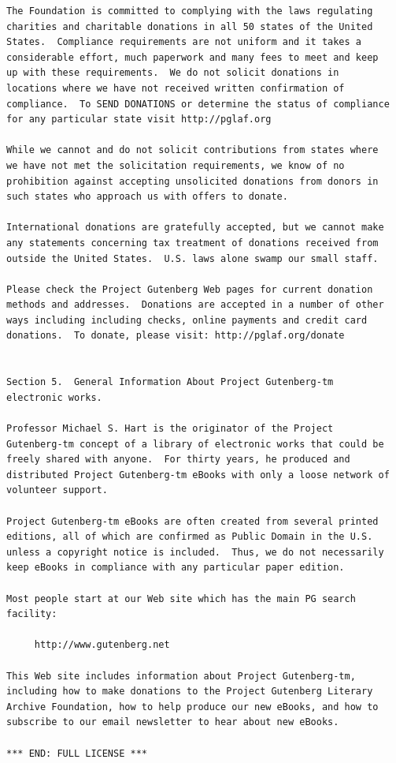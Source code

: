 \documentclass{book}[2004/02/16]
\begin{document}
\begin{verbatim}
The Foundation is committed to complying with the laws regulating
charities and charitable donations in all 50 states of the United
States.  Compliance requirements are not uniform and it takes a
considerable effort, much paperwork and many fees to meet and keep
up with these requirements.  We do not solicit donations in
locations where we have not received written confirmation of
compliance.  To SEND DONATIONS or determine the status of compliance
for any particular state visit http://pglaf.org

While we cannot and do not solicit contributions from states where
we have not met the solicitation requirements, we know of no
prohibition against accepting unsolicited donations from donors in
such states who approach us with offers to donate.

International donations are gratefully accepted, but we cannot make
any statements concerning tax treatment of donations received from
outside the United States.  U.S. laws alone swamp our small staff.

Please check the Project Gutenberg Web pages for current donation
methods and addresses.  Donations are accepted in a number of other
ways including including checks, online payments and credit card
donations.  To donate, please visit: http://pglaf.org/donate


Section 5.  General Information About Project Gutenberg-tm
electronic works.

Professor Michael S. Hart is the originator of the Project
Gutenberg-tm concept of a library of electronic works that could be
freely shared with anyone.  For thirty years, he produced and
distributed Project Gutenberg-tm eBooks with only a loose network of
volunteer support.

Project Gutenberg-tm eBooks are often created from several printed
editions, all of which are confirmed as Public Domain in the U.S.
unless a copyright notice is included.  Thus, we do not necessarily
keep eBooks in compliance with any particular paper edition.

Most people start at our Web site which has the main PG search
facility:

     http://www.gutenberg.net

This Web site includes information about Project Gutenberg-tm,
including how to make donations to the Project Gutenberg Literary
Archive Foundation, how to help produce our new eBooks, and how to
subscribe to our email newsletter to hear about new eBooks.

*** END: FULL LICENSE ***

\end{verbatim}
\end{document}
